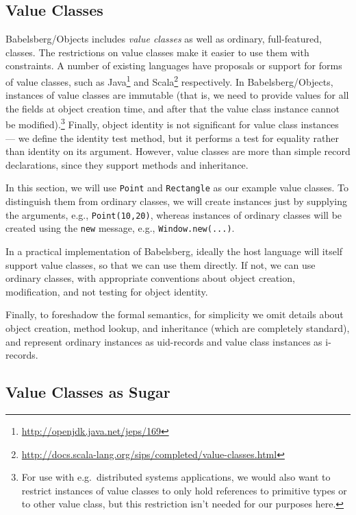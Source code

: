 \documentclass{article}
\begin{document}
\subsection{Value Classes}

Babelsberg/Objects includes \emph{value classes} as well as ordinary,
full-featured, classes.  The restrictions on value classes make it
easier to use them with constraints.  A number of existing languages
have proposals or support for forms of value classes, such
as Java\footnote{\url{http://openjdk.java.net/jeps/169}} and
Scala\footnote{\url{http://docs.scala-lang.org/sips/completed/value-classes.html}}
respectively.
In Babelsberg/Objects, instances of value
classes are immutable (that is, we need to provide values for all the
fields at object creation time, and after that the value class instance
cannot be modified).\footnote{For use with e.g.\ distributed systems 
applications, we would also want to restrict instances of value
classes to only hold references to primitive types or to other value
class, but this restriction isn't needed for our purposes here.}
Finally, object identity is not significant for
value class instances --- we define the identity test method, but it
performs a test for equality rather than identity on its argument.
However, value classes are more than simple record declarations, since
they support methods and inheritance.

In this section, we will use \verb|Point| and \verb|Rectangle| as our
example value classes.  To distinguish them from ordinary classes, we
will create instances just by supplying the arguments, e.g.,
\verb|Point(10,20)|, whereas instances of ordinary classes will be
created using the \verb|new| message, e.g., \verb|Window.new(...)|.

In a practical implementation of Babelsberg, ideally the host language
will itself support value classes, so that we can use them directly.
If not, we can use ordinary classes, with appropriate conventions
about object creation, modification, and not testing for object identity.

Finally, to foreshadow the formal semantics, for simplicity we omit
details about object creation, method lookup, and inheritance (which
are completely standard), and represent ordinary instances as
uid-records and value class instances as i-records.

\subsection{Value Classes as Sugar}
\label{sec:value-classes-as-syntactic-sugar}
\end{document}
